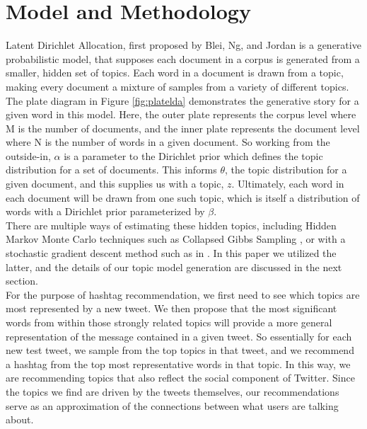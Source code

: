 \documentclass{acm_proc_article-sp}
\begin{document}
\section{Model and Methodology}
\hspace*{5mm}Latent Dirichlet Allocation, first proposed by Blei, Ng, and Jordan \cite{blei2003latent} is a generative probabilistic model, that supposes each document in a corpus is generated from a smaller, hidden set of topics. Each word in a document is drawn from a topic, making every document a mixture of samples from a variety of different topics. The plate diagram in Figure \ref{fig:platelda} demonstrates the generative story for a given word in this model. Here, the outer plate represents the corpus level where M is the number of documents, and the inner plate represents the document level where N is the number of words in a given document. So working from the outside-in, $\alpha$ is a parameter to the Dirichlet prior which defines the topic distribution for a set of documents. This informs $\theta$, the topic distribution for a given document, and this supplies us with a topic, $z$. Ultimately, each word in each document will be drawn from one such topic, which is itself a distribution of words with a Dirichlet prior parameterized by $\beta$.\\
\hspace*{5mm}There are multiple ways of estimating these hidden topics, including Hidden Markov Monte Carlo techniques such as Collapsed Gibbs Sampling \cite{griffiths2002gibbs}, or with a stochastic gradient descent method such as in \cite{hoffman2010online}. In this paper we utilized the latter, and the details of our topic model generation are discussed in the next section.\\
\hspace*{5mm}For the purpose of hashtag recommendation, we first need to see which topics are most represented by a new tweet. We then propose that the most significant words from within those  strongly related topics will provide a more general representation of the message contained in a given tweet. So essentially for each new test tweet, we sample from the top topics in that tweet, and we recommend a hashtag from the top most representative words in that topic. In this way, we are recommending topics that also reflect the social component of Twitter. Since the topics we find are driven by the tweets themselves, our recommendations serve as an approximation of the connections between what users are talking about.\\\\
\end{document}
